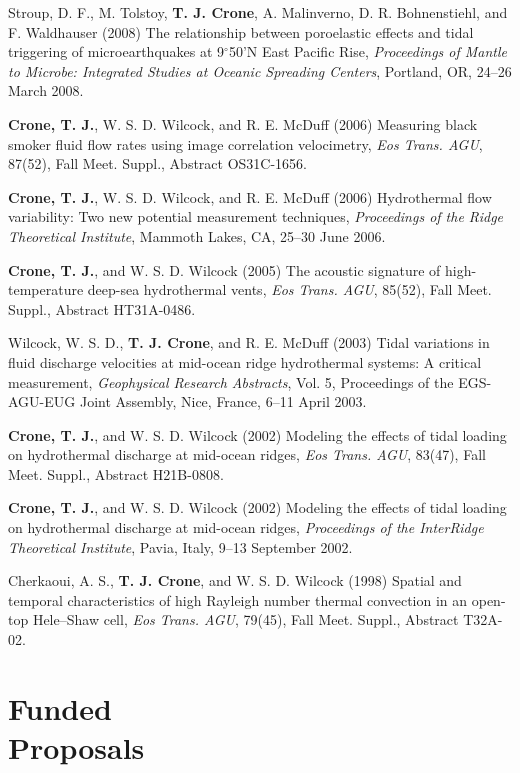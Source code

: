 \documentclass[11pt]{res}
\begin{document}
\begin{resume}
Stroup, D. F., M. Tolstoy, {\bf T. J. Crone}, A. Malinverno, D. R.  Bohnenstiehl, and F.  Waldhauser (2008) The relationship between poroelastic effects and tidal triggering of microearthquakes at 9$^\circ$50'N East Pacific Rise, {\em Proceedings of Mantle to Microbe: Integrated Studies at Oceanic Spreading Centers}, Portland, OR, 24--26 March 2008.

{\bf Crone, T. J.}, W. S. D. Wilcock, and R. E. McDuff (2006) Measuring black smoker fluid flow rates using image correlation velocimetry, {\em Eos Trans.  AGU}, 87(52), Fall Meet.  Suppl., Abstract OS31C-1656.

{\bf Crone, T. J.}, W. S. D. Wilcock, and R. E. McDuff (2006) Hydrothermal flow variability: Two new potential measurement techniques, {\em Proceedings of the Ridge Theoretical Institute}, Mammoth Lakes, CA, 25--30 June 2006. 

{\bf Crone, T. J.}, and W. S. D. Wilcock (2005) The acoustic signature of high-temperature deep-sea hydrothermal vents, {\em Eos Trans. AGU}, 85(52), Fall Meet. Suppl., Abstract HT31A-0486.

Wilcock, W. S. D., {\bf T. J. Crone}, and R. E. McDuff (2003) Tidal variations in fluid discharge velocities at mid-ocean ridge hydrothermal systems: A critical measurement, {\em Geophysical Research Abstracts}, Vol. 5, Proceedings of the EGS-AGU-EUG Joint Assembly, Nice, France, 6--11 April 2003.

{\bf Crone, T. J.}, and W. S. D. Wilcock (2002) Modeling the effects of tidal loading on hydrothermal discharge at mid-ocean ridges, {\em Eos Trans. AGU}, 83(47), Fall Meet.  Suppl., Abstract H21B-0808.

{\bf Crone, T. J.}, and W. S. D. Wilcock (2002) Modeling the effects of tidal loading on hydrothermal discharge at mid-ocean ridges, {\em Proceedings of the InterRidge Theoretical Institute}, Pavia, Italy, 9--13 September 2002.

Cherkaoui, A. S., {\bf T. J. Crone}, and W. S. D. Wilcock (1998) Spatial and temporal characteristics of high Rayleigh number thermal convection in an open-top Hele--Shaw cell, {\em Eos Trans. AGU}, 79(45), Fall Meet. Suppl., Abstract T32A-02.


\section{\sc Funded\\Proposals}


\end{resume}
\end{document}
